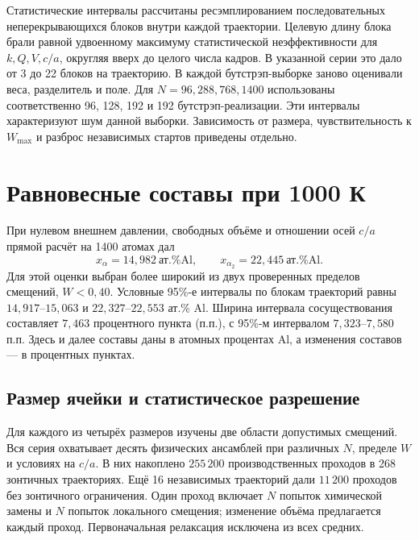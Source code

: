 \documentclass[11pt,a4paper]{article}
\begin{document}
Статистические интервалы рассчитаны ресэмплированием последовательных
неперекрывающихся блоков внутри каждой траектории. Целевую длину блока
брали равной удвоенному максимуму статистической неэффективности
для \(k,Q,V,c/a\), округляя вверх до целого числа кадров.
В указанной серии это дало от 3 до 22 блоков на траекторию. В каждой бутстрэп-выборке
заново оценивали веса, разделитель и поле. Для \(N=96,288,768,1400\)
использованы соответственно 96, 128, 192 и 192 бутстрэп-реализации.
Эти интервалы характеризуют шум данной выборки. Зависимость от размера,
чувствительность к \(W_{\max}\) и разброс независимых стартов
приведены отдельно.

\section{Равновесные составы при 1000 К}
\label{sec:bulk-results}

При нулевом внешнем давлении, свободных объёме и отношении осей
$c/a$ прямой расчёт на 1400 атомах дал
\[
 x_{\alpha}=14{,}982\ \text{ат.\% Al}, \qquad
 x_{\alpha_2}=22{,}445\ \text{ат.\% Al}.
\]
Для этой оценки выбран более широкий из двух проверенных пределов
смещений, $W<0{,}40$. Условные 95\%-е интервалы по блокам траекторий
равны $14{,}917$--$15{,}063$ и $22{,}327$--$22{,}553$ ат.\% Al.
Ширина интервала сосуществования составляет $7{,}463$ процентного
пункта (п.п.), с 95\%-м интервалом $7{,}323$--$7{,}580$ п.п.
Здесь и далее составы даны в атомных процентах Al, а изменения
составов --- в процентных пунктах.

\subsection{Размер ячейки и статистическое разрешение}

Для каждого из четырёх размеров изучены две области допустимых
смещений. Вся серия охватывает десять физических ансамблей при
различных $N$, пределе $W$ и условиях на $c/a$. В них накоплено
$255\,200$ производственных проходов в 268 зонтичных траекториях.
Ещё 16 независимых траекторий дали $11\,200$ проходов без зонтичного
ограничения. Один проход включает $N$ попыток химической замены
и $N$ попыток локального смещения; изменение объёма предлагается
каждый проход. Первоначальная релаксация исключена из всех средних.
\end{document}
